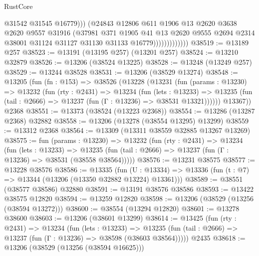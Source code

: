 \begin{lexlean}{RustCore}
\begin{coremodule}
                                @31542
                                @31545
                                @16779)))
                          (@24843
                            @12806
                            @611
                            @1906
                            @13
                            @2620
                            @3638
                            @2620
                            @9557
                            @31916
                            (@37981
                              @371
                              @1905
                              @41
                              @13
                              @2620
                              @9555
                              @2694
                              @2314
                              @38001
                              @31124
                              @31127
                              @31130
                              @31133
                              @16779)))))))))))))
@38519 := @13189 @257
@38523 := @13191 (@13195 @257) (@13201 @257)
@38524 := @13210 @32879
@38526 := @13206 (@38524 @13225)
@38528 := @13248 (@13249 @257)
@38529 := @13244 @38528
@38531 := @13206 (@38529 @13274)
@38548 := @13205
    (fun (fn : @153) =>
    @38526
      (@13228
        (@13231
          (fun (params : @13230) =>
          @13232
            (fun (rty : @2431) =>
            @13234
              (fun (lets : @13233) =>
              @13235 (fun (tail : @2666) => @13237 (fun (Γ : @13236) => @38531 @13321))))))
        @13367))
    @2368
@38551 := @13373 (@38524 (@13223 @2368))
@38554 := @13286 (@13287 @2368) @32882
@38558 := @13206 (@13278 (@38554 @13295) @13299)
@38559 := @13312 @2368
@38564 := @13309 (@13311 @38559 @32885 @13267 @13269)
@38575 := fun (params : @13230) =>
  @13232
    (fun (rty : @2431) =>
    @13234
      (fun (lets : @13233) =>
      @13235 (fun (tail : @2666) => @13237 (fun (Γ : @13236) => @38531 (@38558 @38564)))))
@38576 := @13231 @38575
@38577 := @13228 @38576
@38586 := @13335
    (fun (U : @13334) => @13336 (fun (t : @7) => @13344 (@13206 (@13350 @32882 @13224) @13361)))
@38589 := @38551 (@38577 @38586) @32880
@38591 := @13191 @38576 @38586
@38593 := @13422 @38575 @12820
@38594 := @13259 @12820
@38598 := @13206 (@38529 (@13256 (@38594 @13272)))
@38600 := @38554 (@13294 @12820)
@38601 := @13278 @38600
@38603 := @13206 (@38601 @13299)
@38614 := @13425
    (fun (rty : @2431) =>
    @13234
      (fun (lets : @13233) =>
      @13235 (fun (tail : @2666) => @13237 (fun (Γ : @13236) => @38598 (@38603 @38564)))))
    @2435
@38618 := @13206 (@38529 (@13256 (@38594 @16625)))

\end{coremodule}
\end{lexlean}
